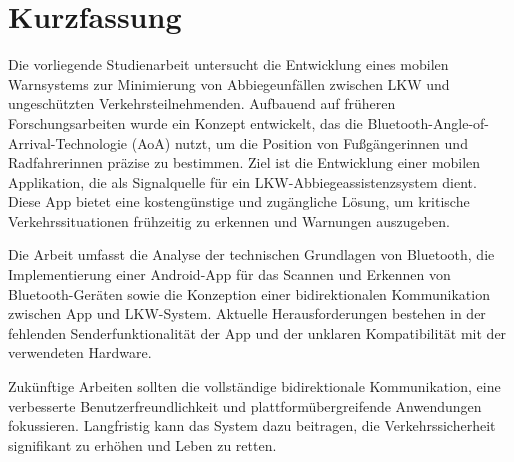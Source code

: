 \documentclass[a4paper, 12pt]{article} %
\begin{document}
\section*{Kurzfassung}
\begin{spacing}{1.8}  %
    \fontsize{14pt}{14pt}\selectfont  %
    Die vorliegende Studienarbeit untersucht die Entwicklung eines mobilen Warnsystems zur Minimierung von Abbiegeunfällen zwischen LKW und ungeschützten Verkehrsteilnehmenden. Aufbauend auf früheren Forschungsarbeiten wurde ein Konzept entwickelt, das die
    Bluetooth-Angle-of-Arrival-Technologie (AoA) nutzt, um die Position 
    von Fußgängerinnen und Radfahrerinnen präzise zu bestimmen. Ziel ist
     die Entwicklung einer mobilen Applikation, die als Signalquelle für
      ein LKW-Abbiegeassistenzsystem dient. Diese App bietet eine 
      kostengünstige und zugängliche Lösung, um kritische 
      Verkehrssituationen frühzeitig zu erkennen und Warnungen auszugeben.

    Die Arbeit umfasst die Analyse der technischen Grundlagen 
    von Bluetooth, die Implementierung einer Android-App 
    für das Scannen 
    und Erkennen von Bluetooth-Geräten sowie die Konzeption 
    einer bidirektionalen Kommunikation zwischen App und LKW-System.
     Aktuelle Herausforderungen bestehen in der fehlenden 
     Senderfunktionalität der App und der unklaren Kompatibilität 
     mit der verwendeten Hardware.
    
    Zukünftige Arbeiten sollten die vollständige bidirektionale 
    Kommunikation, eine verbesserte Benutzerfreundlichkeit und
    plattformübergreifende Anwendungen fokussieren. Langfristig kann das System dazu beitragen, die Verkehrssicherheit signifikant zu erhöhen und Leben zu retten.

\end{spacing}
\end{document}
